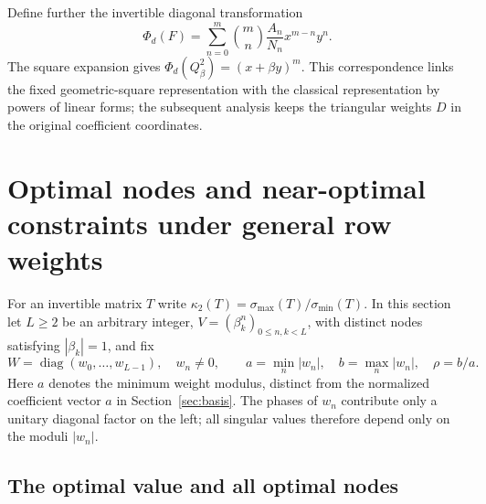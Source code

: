 \documentclass[10pt,twoside,final]{siamart1116}
\numberwithin{equation}{section}
\numberwithin{theorem}{section}
\newcommand{\diag}{\operatorname{diag}}
\newcommand{\cond}{\kappa_2}
\begin{document}
Define further the invertible diagonal transformation
\begin{equation}\label{eq:Phi}
\Phi_d(F)=\sum_{n=0}^{m}\binom{m}{n}\frac{A_n}{N_n}x^{m-n}y^n.
\end{equation}
The square expansion gives $\Phi_d(Q_\beta^2)=(x+\beta y)^m$. This correspondence links
the fixed geometric-square representation with the classical representation by powers of
linear forms; the subsequent analysis keeps the triangular weights $D$ in the original
coefficient coordinates.

\section{Optimal nodes and near-optimal constraints under general row weights}
\label{sec:weighted}

For an invertible matrix $T$ write $\cond(T)=\sigma_{\max}(T)/\sigma_{\min}(T)$. In this
section let $L\ge2$ be an arbitrary integer, $V=(\beta_k^n)_{0\le n,k<L}$, with distinct
nodes satisfying $|\beta_k|=1$, and fix
\[
W=\diag(w_0,\ldots,w_{L-1}),\quad w_n\ne0,\qquad
a=\min_n|w_n|,\quad b=\max_n|w_n|,\quad \rho=b/a.
\]
Here $a$ denotes the minimum weight modulus, distinct from the normalized
coefficient vector $a$ in Section~\ref{sec:basis}.
The phases of $w_n$ contribute only a unitary diagonal factor on the left;
all singular values therefore depend only on the moduli $|w_n|$.

\subsection{The optimal value and all optimal nodes}
\end{document}
